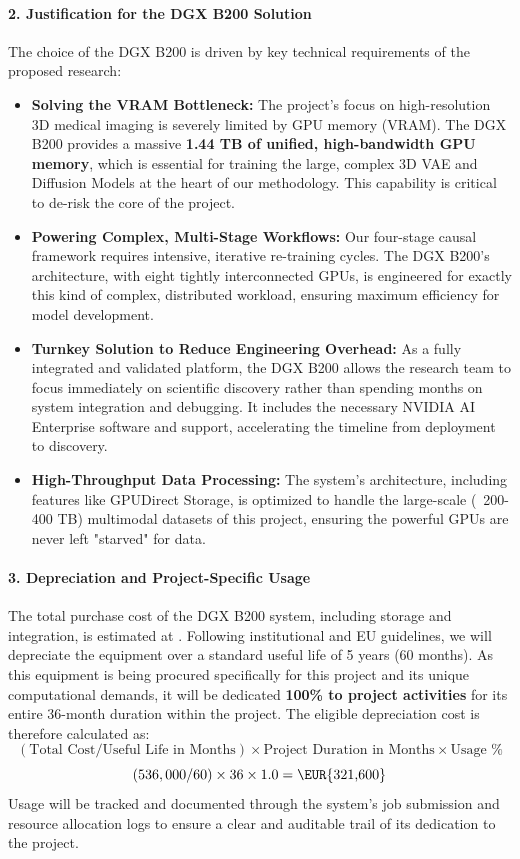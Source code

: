 \documentclass[11pt, a4paper]{article}
\begin{document}
\paragraph{2. Justification for the DGX B200 Solution}
The choice of the DGX B200 is driven by key technical requirements of the proposed research:
\begin{itemize}
    \item \textbf{Solving the VRAM Bottleneck:} The project's focus on high-resolution 3D medical imaging is severely limited by GPU memory (VRAM). The DGX B200 provides a massive \textbf{1.44 TB of unified, high-bandwidth GPU memory}, which is essential for training the large, complex 3D VAE and Diffusion Models at the heart of our methodology. This capability is critical to de-risk the core of the project.
    \item \textbf{Powering Complex, Multi-Stage Workflows:} Our four-stage causal framework requires intensive, iterative re-training cycles. The DGX B200's architecture, with eight tightly interconnected GPUs, is engineered for exactly this kind of complex, distributed workload, ensuring maximum efficiency for model development.
    \item \textbf{Turnkey Solution to Reduce Engineering Overhead:} As a fully integrated and validated platform, the DGX B200 allows the research team to focus immediately on scientific discovery rather than spending months on system integration and debugging. It includes the necessary NVIDIA AI Enterprise software and support, accelerating the timeline from deployment to discovery.
    \item \textbf{High-Throughput Data Processing:} The system's architecture, including features like GPUDirect Storage, is optimized to handle the large-scale (~200-400 TB) multimodal datasets of this project, ensuring the powerful GPUs are never left "starved" for data.
\end{itemize}

\paragraph{3. Depreciation and Project-Specific Usage}
The total purchase cost of the DGX B200 system, including storage and integration, is estimated at . Following institutional and EU guidelines, we will depreciate the equipment over a standard useful life of 5 years (60 months). As this equipment is being procured specifically for this project and its unique computational demands, it will be dedicated \textbf{100\% to project activities} for its entire 36-month duration within the project. The eligible depreciation cost is therefore calculated as:
$$ (\text{Total Cost} / \text{Useful Life in Months}) \times \text{Project Duration in Months} \times \text{Usage \%} $$
$$ (536,000 / 60) \times 36 \times 1.0 = \text{\EUR{321,600}} $$
Usage will be tracked and documented through the system's job submission and resource allocation logs to ensure a clear and auditable trail of its dedication to the project.
\end{document}
